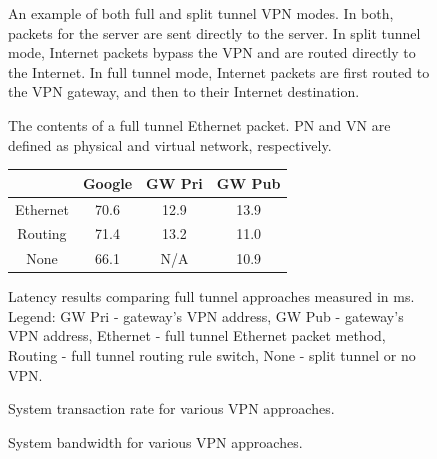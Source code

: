 \begin{figure}[ht]
\centering
{}
\caption[An example of both full and split tunnel VPN modes]{An example of both
full and split tunnel VPN modes.  In both, packets for the server are sent
directly to the server.  In split tunnel mode, Internet packets bypass the VPN
and are routed directly to the Internet.  In full tunnel mode, Internet packets
are first routed to the VPN gateway, and then to their Internet destination.}
\label{fig:tunnel}
\end{figure}

\begin{figure}[ht]
\centering
{}
\caption[The contents of a full tunnel Ethernet packet]{The contents of a full
tunnel Ethernet packet.  PN and VN are defined as physical and virtual network,
respectively.}
\label{fig:tunnel_packet}
\end{figure}

\begin{figure}[ht]
\begin{center}
\begin{tabular}{|c||c|c|c|} \hline
& Google & GW Pri & GW Pub \\ \hline \hline
Ethernet & 70.6 & 12.9 & 13.9 \\ \hline
Routing & 71.4 & 13.2 & 11.0 \\ \hline
None & 66.1 & N/A & 10.9 \\ \hline
\end{tabular}
\end{center}
\label{tab:full_tunnel_eval}
\caption[Full tunnel evaluation]{Latency results comparing full tunnel
approaches measured in ms.  Legend: GW Pri - gateway's VPN address, GW Pub -
gateway's VPN address, Ethernet - full tunnel Ethernet packet method, Routing -
full tunnel routing rule switch, None - split tunnel or no VPN.}
\end{figure}

\clearpage

\begin{figure}[ht]
\centering
{}
\caption{System transaction rate for various VPN approaches.}
\label{fig:latency}
\end{figure}

\begin{figure}[ht]
\centering
{}
\caption{System bandwidth for various VPN approaches.}
\label{fig:bandwidth}
\end{figure}

